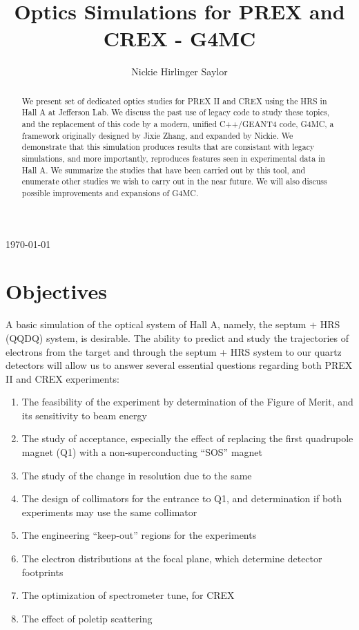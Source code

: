\documentclass[11pt]{amsart}
\title{Optics Simulations for PREX and CREX - G4MC}
\author{Nickie Hirlinger Saylor}%
\begin{document}
\maketitle

\begin{center}
\today
\end{center}

\begin{abstract}
We present set of dedicated optics studies for PREX II and CREX using the HRS in Hall A at Jefferson Lab. We discuss the past use of legacy code to study these topics, and the replacement of this code by a modern, unified C++/GEANT4 code, G4MC, a framework originally designed by Jixie Zhang, and expanded by Nickie. We demonstrate that this simulation produces results that are consistant with legacy simulations, and more importantly, reproduces features seen in experimental data in Hall A. We summarize the studies that have been carried out by this tool, and enumerate other studies we wish to carry out in the near future. We will also discuss possible improvements and expansions of G4MC. 
\end{abstract}

\section{Objectives}

A basic simulation of the optical system of Hall A, namely, the septum + HRS (QQDQ) system, is desirable. The ability to predict and study the trajectories of electrons from the target and through the septum + HRS system to our quartz detectors will allow us to answer several essential questions regarding both PREX II and CREX experiments:

\begin{enumerate}
  \item The feasibility of the experiment by determination of the Figure of Merit, and its sensitivity to beam energy
  \item The study of acceptance, especially the effect of replacing the first quadrupole magnet (Q1) with a non-superconducting ``SOS'' magnet
  \item The study of the change in resolution due to the same
  \item The design of collimators for the entrance to Q1, and determination if both experiments may use the same collimator
  \item The engineering ``keep-out'' regions for the experiments
  \item The electron distributions at the focal plane, which determine detector footprints
  \item The optimization of spectrometer tune, for CREX
  \item The effect of poletip scattering
\end{enumerate}
\end{document}
